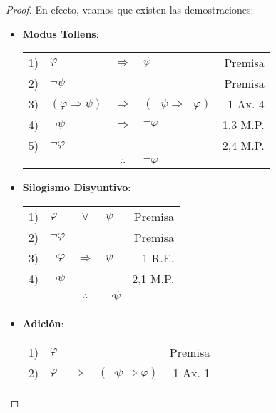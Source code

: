 \documentclass[12pt]{report}
\theoremstyle{largebreak}
\begin{document}
    \begin{proof}
        En efecto, veamos que existen las demostraciones:
        \begin{itemize}
            \item \textbf{Modus Tollens}:
            \begin{center}
                \begin{tabular}{l l c l r}
                    1) & $\varphi$ & $\Rightarrow$ & $\psi$ & Premisa \\
                    2) & $\neg\psi$ &  &  & Premisa \\
                    3) & $(\varphi\Rightarrow\psi)$ & $\Rightarrow$ & $(\neg\psi\Rightarrow\neg\varphi)$ & 1 Ax. 4 \\
                    4) & $\neg\psi$ & $\Rightarrow$ & $\neg\varphi$ & 1,3 M.P. \\
                    5) & $\neg\varphi$ &  &  & 2,4 M.P. \\
                    \hline
                    & & $\therefore$ & $\neg\varphi$ & \\
                \end{tabular}
            \end{center}
            \item \textbf{Silogismo Disyuntivo}:
            \begin{center}
                \begin{tabular}{l l c l r}
                    1) & $\varphi$ & $\lor$ & $\psi$ & Premisa \\
                    2) & $\neg\varphi$ &  &  & Premisa \\
                    3) & $\neg\varphi$ & $\Rightarrow$ & $\psi$ & 1 R.E.\\
                    4) & $\neg\psi$ &  &  & 2,1 M.P. \\
                    \hline
                    & & $\therefore$ & $\neg\psi$ & \\
                \end{tabular}
            \end{center}
            \item \textbf{Adición}:
            \begin{center}
                \begin{tabular}{l l c l r}
                    1) & $\varphi$ &  &  & Premisa \\
                    2) & $\varphi$ & $\Rightarrow$ & $(\neg\psi\Rightarrow\varphi)$ & 1 Ax. 1 \\

\end{tabular}
\end{center}
\end{itemize}
\end{proof}
\end{document}
